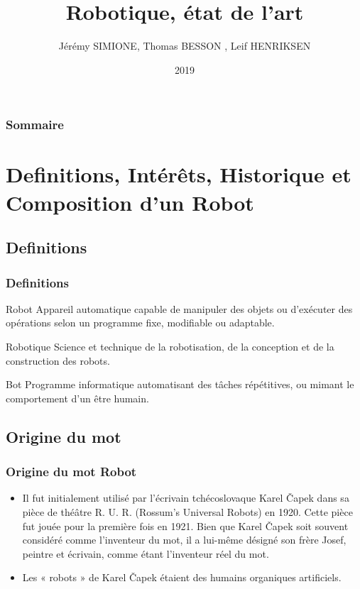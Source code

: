 \documentclass{beamer}
\title{Robotique, état de l'art}
\author{Jérémy SIMIONE, Thomas BESSON , Leif HENRIKSEN}
\institute{Université de Montpellier}
\date{2019}
\begin{document}
\begin{frame}
  \titlepage
\end{frame}

\begin{frame}
  \frametitle{Sommaire}
  {\small \tableofcontents}
\end{frame}

\section{Definitions, Intérêts, Historique et Composition d'un Robot}
\subsection{Definitions}

\begin{frame}
  \frametitle{Definitions}
  
\begin{block}{Robot}
Appareil automatique capable de manipuler des objets ou d'exécuter des opérations selon un programme fixe, modifiable ou adaptable.
\end{block}

\begin{block}{Robotique}
Science et technique de la robotisation, de la conception et de la construction des robots.
\end{block}

\begin{block}{Bot}
 Programme informatique automatisant des tâches répétitives, ou mimant le comportement d’un être humain.
\end{block}
\end{frame}




\subsection{Origine du mot}
\begin{frame}
  \frametitle{Origine du mot Robot}
	\begin{itemize}
		\item Il fut initialement utilisé par l’écrivain tchécoslovaque Karel Čapek dans sa pièce de théâtre R. U. R. 		(Rossum's Universal Robots) en 1920. Cette pièce fut jouée pour la première fois en 1921. Bien que Karel Čapek soit souvent considéré comme l’inventeur du mot, il a lui-même désigné son frère Josef, peintre et écrivain, comme étant l’inventeur réel du mot.
	
		\item  Les « robots » de Karel Čapek étaient des humains organiques artificiels.
	\end{itemize}
\end{frame}
\end{document}
